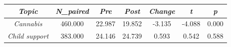 \begin{tabular}{c c c c c c c}
      \hline
      \textit{Topic} & \textit{N\_paired} & \textit{Pre} & \textit{Post} & \textit{Change} & \textit{t} & \textit{p} \\
      \hline
      \textit{Cannabis} & 460.000 & 22.987 & 19.852 & -3.135 & -4.088 & 0.000 \\
      \textit{Child support} & 383.000 & 24.146 & 24.739 & 0.593 & 0.542 & 0.588 \\
      \hline
    \end{tabular}